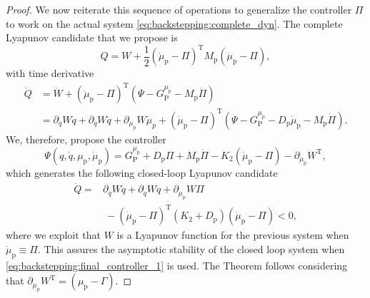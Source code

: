 \begin{proof}
	We now reiterate this sequence of operations to generalize the controller $\Pi$ to work on the actual system \eqref{eq:backstepping:complete_dyn}.
	The complete Lyapunov candidate that we propose is
	\begin{equation}
		Q = W + \frac{1}{2}(\dot{\mu}_\mathrm{p} - \Pi)^{\mathrm{T}} M_\mathrm{p} (\dot{\mu}_\mathrm{p} - \Pi),
	\end{equation}
	with time derivative
	\begin{equation*}
		\begin{split}
			\dot{Q} &= \dot{W} + (\dot{\mu}_\mathrm{p} - \Pi)^{\mathrm{T}} (\Psi - G_{\mathrm{P}}^{\mu_\mathrm{p}} - M_\mathrm{p} \dot{\Pi}) \\
			 &= \partial_{q} W \dot{q} + \partial_{\dot{q}} W \ddot{q} + \partial_{\mu_\mathrm{p}} W \dot{\mu}_p + (\dot{\mu}_\mathrm{p} - \Pi)^{\mathrm{T}} (\Psi - G_{\mathrm{P}}^{\mu_\mathrm{p}} - D_\mathrm{p} \dot{\mu}_\mathrm{p} - M_\mathrm{p} \dot{\Pi}) .
		\end{split}
	\end{equation*}
	We, therefore, propose the controller
	\begin{equation}\label{eq:backstepping:final_controller_1}
	    \Psi(q, \dot{q}, \mu_\mathrm{p}, \dot{\mu}_\mathrm{p}) = G_{\mathrm{P}}^{\mu_\mathrm{p}} + D_\mathrm{p} \Pi + M_\mathrm{p} \dot{\Pi} - K_2 (\dot{\mu}_\mathrm{p} - \Pi) 
	    - \partial_{\mu_\mathrm{p}} W^{\mathrm{T}}\!,
	\end{equation}
	which generates the following closed-loop Lyapunov candidate
	\begin{equation}
	    \begin{split}
			\dot{Q} =& \partial_{q} W \dot{q} + \partial_{\dot{q}} W \ddot{q} + \partial_{\mu_\mathrm{p}} W \Pi \\
			&\: - (\dot{\mu}_\mathrm{p} - \Pi)^{\mathrm{T}} (K_2 + D_\mathrm{p}) (\dot{\mu}_\mathrm{p} - \Pi)
			< 0,
	    \end{split}
	\end{equation}
	where we exploit that $W$ is a Lyapunov function for the previous system when $\dot{\mu}_\mathrm{p} \equiv \Pi$. This assures the asymptotic stability of the closed loop system when \eqref{eq:backstepping:final_controller_1} is used. The Theorem follows considering that $\partial_{\mu_\mathrm{p}} W^{\mathrm{T}} = (\mu_\mathrm{p} - \Gamma)$.
	

\end{proof}
